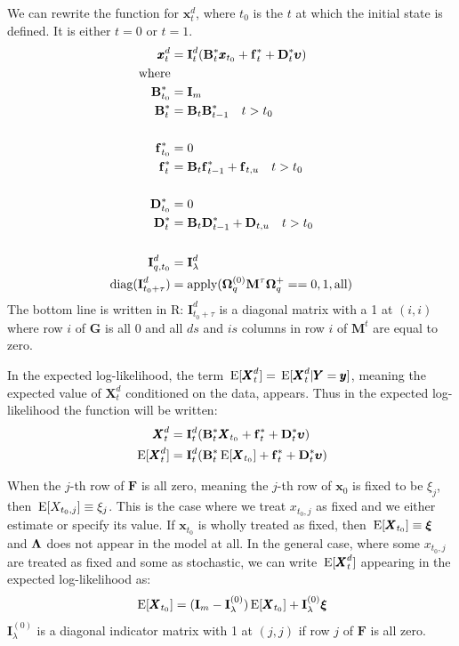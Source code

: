 \documentclass[]{article}
\def\uupsilon{\pmb{\upsilon}}
\def\xixi{\mbox{\boldmath $\xi$}}
\def\LAM{\mbox{\boldmath $\Lambda$}}
\def\OMG{\mbox{\boldmath $\Omega$}}
\def\UPS{\mbox{\boldmath $\Upsilon$}}
\def\BB{\mbox{$\mathbf B$}}	\def\bb{\mbox{$\mathbf b$}} \def\Bb{\mbox{$\mathbf J$}} \def\Ba{\mbox{$\mathbf L$}} \def\Bm{\UPS}
\def\DD{\mbox{$\mathbf D$}}	\def\dd{\mbox{$\mathbf d$}}
\def\E{\,\textup{\textrm{E}}}
\def\FF{\mbox{$\mathbf F$}} \def\ff{\mbox{$\mathbf f$}}
\def\GG{\mbox{$\mathbf G$}}	\def\gg{\mbox{$\mathbf g$}}
\def\II{\mbox{$\mathbf I$}} \def\ii{\mbox{$\mathbf i$}}
\def\MM{\mbox{$\mathbf M$}}  \def\mm{\mbox{$\mathbf m$}}
\def\XX{\mbox{$\pmb{X}$}}	\def\xx{\mbox{$\pmb{x}$}}
\def\YY{\mbox{$\pmb{Y}$}}	\def\yy{\mbox{$\pmb{y}$}}
\begin{document}
We can rewrite the function for $\xx_t^d$, where $t_0$ is the $t$ at which the initial state is defined.  It is either $t=0$ or $t=1$.
\begin{equation} \label{eq:xt.det.sum2}
\begin{split}
\xx_t^d &= \II_t^d(\BB^*_t\xx_{t_0} + \ff^*_t +\DD^*_t\uupsilon) \\
\text{where}&\\
\BB^*_{t_0} &= \II_m \\
\BB^*_{t} &=\BB_t\BB^*_{t-1}\quad t > t_0 \\ 
\\
\ff^*_{t_0} &= 0 \\
\ff^*_t &=\BB_t\ff^*_{t-1} + \ff_{t,u}\quad t > t_0\\ 
\\
\DD^*_{t_0} &= 0 \\
\DD^*_t &= \BB_t\DD^*_{t-1}  + \DD_{t,u}\quad t > t_0\\ 
\\
\II_{q,t_0}^d&=\II_\lambda^d\\
\text{diag}(\II_{t_0+\tau}^d)&=\text{apply}(\OMG_q^{(0)}\MM^\tau\OMG_q^+ == 0, 1, \text{all}) 
\end{split}
\end{equation}
The bottom line is written in R: $\II_{t_0+\tau}^d$ is a diagonal matrix with a 1 at $(i,i)$ where row $i$ of $\GG$ is all 0 and all $ds$ and $is$ columns in row $i$ of $\MM^t$ are equal to zero.

In the expected log-likelihood, the term $\E[\XX_t^d]=\E[\XX_t^d|\YY=\yy]$, meaning the expected value of $\XX_t^d$ conditioned on the data, appears. Thus in the expected log-likelihood the function will be written:
\begin{equation}
\begin{split}
\XX_t^d &= \II_t^d(\BB^*_t\XX_{t_0} + \ff^*_t +\DD^*_t\uupsilon) \\
\E[\XX_t^d] &= \II_t^d(\BB^*_t\E[\XX_{t_0}] + \ff^*_t +\DD^*_t\uupsilon)
\end{split}
\end{equation}

When the $j$-th row of $\FF$ is all zero, meaning the $j$-th row of $\xx_0$ is fixed to be $\xi_j$, then $\E[X_{t_0,j}]\equiv\xi_j$.  This is the case where we treat $x_{t_0,j}$ as fixed and we either estimate or specify its value.  If $\xx_{t_0}$ is wholly treated as fixed, then $\E[\XX_{t_0}]\equiv\xixi$ and $\LAM$ does not appear in the model at all.  In the general case, where some $x_{t_0,j}$ are treated as fixed and some as stochastic, we can write $\E[\XX_t^d]$ appearing in the expected log-likelihood as:
\begin{equation}\label{eq:EXtd}
\begin{split}
\E[\XX_{t_0}]=(\II_m-\II_\lambda^{(0)})\E[\XX_{t_0}]+\II_\lambda^{(0)}\xixi
\end{split}
\end{equation}
$\II_\lambda^{(0)}$ is a diagonal indicator matrix with 1 at $(j,j)$ if row $j$ of $\FF$ is all zero.
  
\end{document}

